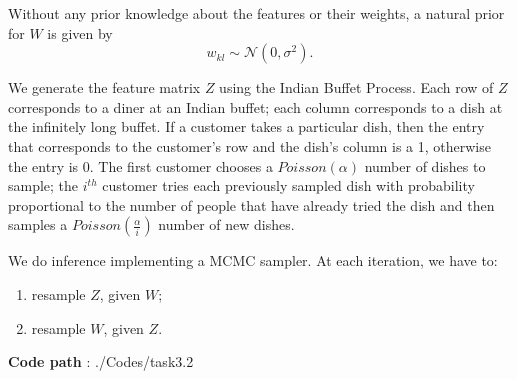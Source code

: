 \documentclass[]{article}
\begin{document}
	Without any prior knowledge about the features or their weights, a natural prior for $W$ is given by 
	$$
	w_{kl} \sim \mathcal{N}(0,\sigma^2).
	$$
	
	We generate the feature matrix $Z$ using the Indian Buffet Process. Each row of $Z$ corresponds to a diner at an Indian buffet; each column corresponds to a dish at the infinitely long buffet. If a customer takes a particular dish, then the entry that corresponds to the customer's row and the dish's column is a 1, otherwise the entry is 0. The first customer chooses a $Poisson(\alpha)$ number of dishes to sample; the $i^{th}$ customer tries each previously sampled dish with probability proportional to the number of people that have already tried the dish and then samples a $Poisson(\frac{\alpha}{i})$ number of new dishes. 
	
	We do inference implementing a MCMC sampler. At each iteration, we have to:
	\begin{enumerate}
		\item resample $Z$, given $W$;
		\item resample $W$, given $Z$.
	\end{enumerate}

	\textbf{Code path} : ./Codes/task3.2
	
\end{document}
